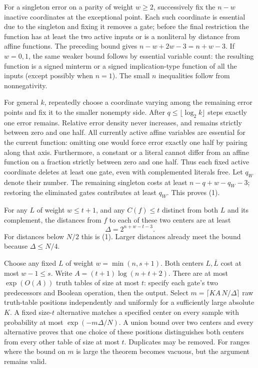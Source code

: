 \documentclass[11pt]{article}
\begin{document}
For a singleton error on a parity of weight \(w\ge2\), successively fix the \(n-w\) inactive coordinates at the exceptional point. Each such coordinate is essential due to the singleton and fixing it removes a gate; before the final restriction the function has at least the two active inputs or is a nonliteral by distance from affine functions. The preceding bound gives \(n-w+2w-3=n+w-3\). If \(w=0,1\), the same weaker bound follows by essential variable count: the resulting function is a signed minterm or a signed implication-type function of all the inputs (except possibly when \(n=1\)). The small \(n\) inequalities follow from nonnegativity.

For general \(k\), repeatedly choose a coordinate varying among the remaining error points and fix it to the smaller nonempty side. After \(q\le\lfloor\log_2 k\rfloor\) steps exactly one error remains. Relative error density never increases, and remains strictly between zero and one half. All currently active affine variables are essential for the current function: omitting one would force error exactly one half by pairing along that axis. Furthermore, a constant or a literal cannot differ from an affine function on a fraction strictly between zero and one half. Thus each fixed active coordinate deletes at least one gate, even with complemented literals free. Let \(q_W\) denote their number. The remaining singleton costs at least \(n-q+w-q_W-3\); restoring the eliminated gates contributes at least \(q_W\). This proves (1).

For any \(L\) of weight \(w\le t+1\), and any \(C(f)\le t\) distinct from both \(L\) and its complement, the distances from \(f\) to each of these two centers are at least
\[
                         \Delta=2^{n+w-t-3}. \tag{2}
\]
For distances below \(N/2\) this is (1). Larger distances already meet the bound because \(\Delta\le N/4\).

Choose any fixed \(L\) of weight \(w=\min(n,s+1)\). Both centers \(L,\overline L\) cost at most \(w-1\le s\). Write \(A=(t+1)\log(n+t+2)\). There are at most \(\exp(O(A))\) truth tables of size at most \(t\): specify each gate's two predecessors and Boolean operation, then the output. Select \(m=\lceil K A\,N/\Delta\rceil\) raw truth-table positions independently and uniformly for a sufficiently large absolute \(K\). A fixed size-\(t\) alternative matches a specified center on every sample with probability at most \(\exp(-m\Delta/N)\). A union bound over two centers and every alternative proves that one choice of these positions distinguishes both centers from every other table of size at most \(t\). Duplicates may be removed. For ranges where the bound on \(m\) is large the theorem becomes vacuous, but the argument remains valid.
\end{document}
